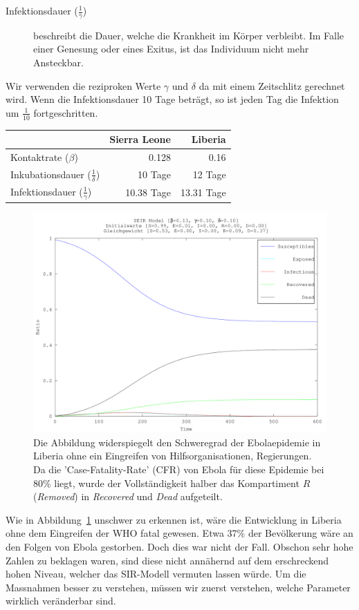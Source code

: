 \begin{refsection}
\begin{description}
  \item [Infektionsdauer ($\frac{1}{\gamma}$)] beschreibt die Dauer, welche die Krankheit im Körper verbleibt. Im Falle einer Genesung oder eines Exitus, ist das Individuum nicht mehr Ansteckbar. 
\end{description}
Wir verwenden die reziproken Werte $\gamma$ und $\delta$ da mit einem Zeitschlitz gerechnet wird. Wenn die Infektionsdauer 10 Tage beträgt, so ist jeden Tag die Infektion um $\frac{1}{10}$ fortgeschritten.
\begin{table}[h]
\centering
\begin{tabular}{ l r r }
						& Sierra Leone & Liberia \\
						\hline
  Kontaktrate ($\beta$) & 0.128 & 0.16 \\
  Inkubationsdauer ($\frac{1}{\delta}$) & 10 Tage & 12 Tage \\
  Infektionsdauer ($\frac{1}{\gamma}$) & 10.38 Tage & 13.31 Tage \\
\end{tabular}
\end{table}
\begin{figure}[ht]
	\centering
	\includegraphics[width=.8\textwidth]{sir/images/ebola_outbreak}
  \caption[Ebola Ausbruch]{Die Abbildung widerspiegelt den Schweregrad der Ebolaepidemie in Liberia ohne ein Eingreifen von Hilfsorganisationen, Regierungen. Da die 'Case-Fatality-Rate' (CFR) von Ebola für diese Epidemie bei 80\% liegt\cite{sir:estimating_fatality}, wurde der Vollständigkeit halber das Kompartiment $R$ (\emph{Removed}) in \emph{Recovered} und \emph{Dead} aufgeteilt.}
  \label{fig:ebola_outbreak}
\end{figure}

Wie in Abbildung~\ref{fig:ebola_outbreak} unschwer zu erkennen ist, wäre die Entwicklung in Liberia ohne dem Eingreifen der WHO fatal gewesen. Etwa 37\% der Bevölkerung wäre an den Folgen von Ebola gestorben. Doch dies war nicht der Fall. Obschon sehr hohe Zahlen zu beklagen waren, sind diese nicht annähernd auf dem erschreckend hohen Niveau, welcher das SIR-Modell vermuten lassen würde. Um die Massnahmen besser zu verstehen, müssen wir zuerst verstehen, welche Parameter wirklich veränderbar sind.


\end{refsection}
